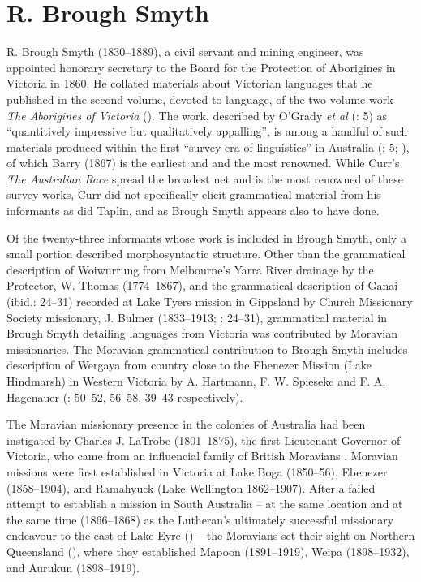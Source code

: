 \section{R. Brough Smyth \citeyearpar{smyth_aborigines_1878}}
\label{sec:key:7.2}\label{bkm:Ref456083856}

R. Brough Smyth (1830--1889), a civil servant and mining engineer, was appointed honorary secretary to the Board for the Protection of Aborigines in Victoria in 1860. He collated materials about Victorian languages that he published in the second volume, devoted to language, of the two-volume work \textit{The Aborigines of Victoria} (\citeyear{smyth_aborigines_1878}). The work, described by O’Grady \textit{et al} (\citeyear{ogrady_languages_1966}: 5) as “quantitively impressive but qualitatively appalling”, is among a handful of such materials produced within the first “survey-era of linguistics” in Australia (\citealt{ogrady_languages_1966}: 5; \citealt{mcgregor_introduction_2008}), of which Barry (1867) is the earliest and \citet{taplin_1879a_nodate} and \citet{curr_australian_1886} the most renowned. While Curr’s \textit{The Australian Race} spread the broadest net and is the most renowned of these survey works, Curr did not specifically elicit grammatical material from his informants as did Taplin, and as Brough Smyth appears also to have done.

Of the twenty-three informants whose work is included in Brough Smyth, only a small portion described morphosyntactic structure. Other than the grammatical description of Woiwurrung \citep[118--120]{smyth_aborigines_1878} from Melbourne’s Yarra River drainage by the Protector, W. Thomas (1774--1867), and the grammatical description of Ganai (ibid.: 24--31) recorded at Lake Tyers mission in Gippsland by Church Missionary Society missionary, J. Bulmer (1833--1913; \citeyear{smyth_aborigines_1878}: 24--31), grammatical material in Brough Smyth detailing languages from Victoria was contributed by Moravian missionaries. The Moravian grammatical contribution to Brough Smyth includes description of Wergaya from country close to the Ebenezer Mission (Lake Hindmarsh) in Western Victoria by A. Hartmann, F. W. Spieseke and F. A. Hagenauer (\citeyear{smyth_aborigines_1878}: 50--52, 56--58, 39--43 respectively).

The Moravian missionary presence in the colonies of Australia had been instigated by Charles J. LaTrobe (1801--1875), the first Lieutenant Governor of Victoria, who came from an influencial family of British Moravians \citep[57--62]{jensz_german_2010}. Moravian missions were first established in Victoria at Lake Boga (1850--56), Ebenezer (1858--1904), and Ramahyuck (Lake Wellington 1862--1907). After a failed attempt to establish a mission in South Australia – at the same location and at the same time (1866--1868) as the Lutheran’s ultimately successful missionary endeavour to the east of Lake Eyre () – the Moravians set their sight on Northern Queensland (), where they established Mapoon (1891--1919), Weipa (1898--1932), and Aurukun (1898--1919).

